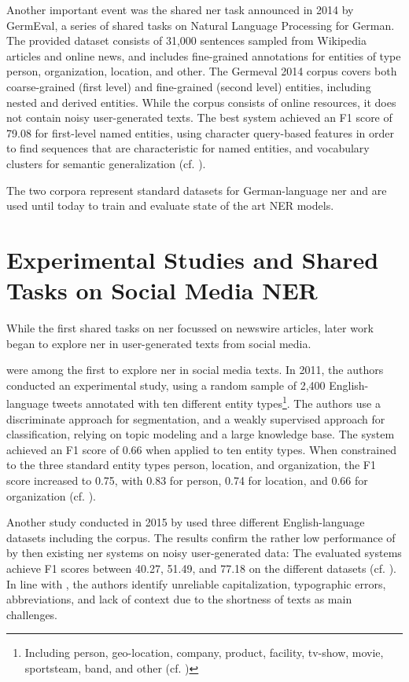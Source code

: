 Another important event was the shared \gls{ner} task 
announced in 2014 by GermEval, a series of shared tasks on Natural Language Processing for German. The provided dataset consists of  31,000 sentences sampled from Wikipedia articles and online news, and includes fine-grained annotations for entities of type person, organization, location, and other. The Germeval 2014 corpus covers both coarse-grained (first level) and fine-grained (second level) entities, including nested and derived entities. While the corpus consists of online resources, it does not contain noisy user-generated texts. 
The best system achieved an F1 score of 79.08 for first-level named entities, using character query-based features in order to find sequences that are characteristic for named entities, and vocabulary clusters for semantic generalization (cf. \cite{benikova-etal-2014-nosta}). 

The two corpora represent standard datasets for German-language \gls{ner} and are used until today to train and evaluate state of the art NER models. 

\section{Experimental Studies and Shared Tasks on Social Media NER}
\label{sec:shared_tasks_sm}
While the first shared tasks on \gls{ner} focussed on newswire articles, later work began to explore \gls{ner} in user-generated texts from social media.

\citeauthor{ritter_2011} were among the first to explore \gls{ner} in social media texts. In 2011, the authors conducted an experimental study, using a random sample of 2,400 English-language tweets annotated with ten different entity types\footnote{Including person, geo-location, company, product, facility, tv-show, movie, sportsteam, band, and other (cf. \cite{ritter_2011})}. 
The authors use a discriminate approach for segmentation, and a weakly supervised approach for classification, relying on topic modeling and a large knowledge base. The system achieved an F1 score of 0.66 when applied to ten entity types. When constrained to the three standard entity types person, location, and organization, the F1 score increased to 0.75, with 0.83 for person, 0.74 for location, and 0.66 for organization (cf. \cite{ritter_2011}). 

Another study conducted in 2015 by \citeauthor{derczynski_analysis_2015} used three different English-language datasets including the \citeauthor{ritter_2011} corpus. The results confirm the rather low performance of by then existing \gls{ner} systems on noisy user-generated data: The evaluated systems achieve F1 scores between 40.27, 51.49, and 77.18 on the different datasets (cf. \cite{derczynski_analysis_2015}). In line with \cite{ritter_2011}, the authors identify unreliable capitalization, typographic errors, abbreviations, and lack of context due to the shortness of texts as main challenges. 

